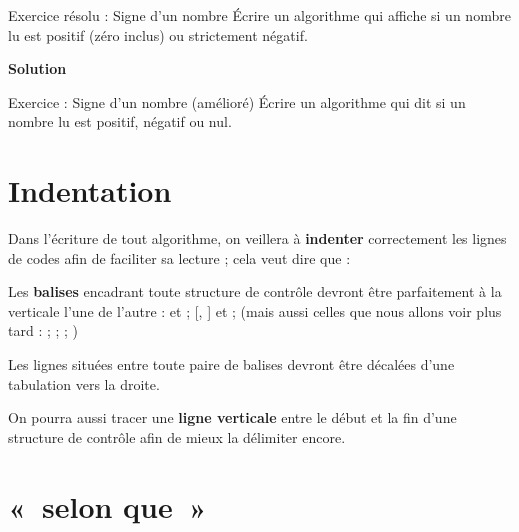 \begin{Emphase}[exercice]{Exercice résolu : Signe d'un nombre}
Écrire un algorithme qui affiche si un nombre lu est positif (zéro inclus)
ou strictement négatif.

{\bfseries Solution}

\end{Emphase}


\begin{Emphase}[exercice]{Exercice : Signe d'un nombre (amélioré)}
Écrire un algorithme qui dit si un nombre lu est positif, négatif ou
nul.
\end{Emphase}

\section{Indentation}

Dans l’écriture de tout algorithme, on veillera à \textbf{indenter}
correctement les lignes de codes afin de faciliter sa lecture ; cela
veut dire que :

\begin{liste}
\item {
Les \textbf{balises} encadrant toute structure de contrôle devront être
parfaitement à la verticale l’une de l’autre : 
et  ; 
[, ] et 
; (mais aussi celles que nous allons voir plus tard
:  ; 
; 
 
; )}
\item {
Les lignes situées entre toute paire de balises devront être décalées
d'une tabulation vers la droite.}
\item {
On pourra aussi tracer une \textbf{ligne verticale} entre le début et la
fin d'une structure de contrôle afin de mieux la
délimiter encore. }
\end{liste}

\section{«~selon que~»}

